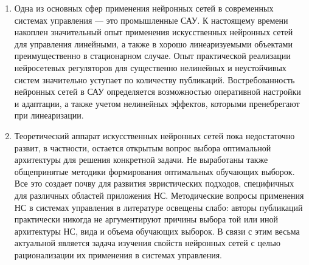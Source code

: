 \begin{enumerate}

\item

Одна из основных сфер применения нейронных сетей в современных
системах управления --- это промышленные САУ.  К настоящему времени
накоплен значительный опыт применения искусственных нейронных сетей
для управления линейными, а также в хорошо линеаризуемыми объектами
преимущественно в стационарном случае.  Опыт практической реализации
нейросетевых регуляторов для существенно нелинейных и неустойчивых
систем значительно уступает по количеству публикаций.
Востребованность нейронных сетей в САУ определяется возможностью
оперативной настройки и адаптации, а также учетом нелинейных эффектов,
которыми пренебрегают при линеаризации.



\item
Теоретический аппарат искусственных нейронных сетей пока недостаточно
развит, в частности, остается открытым вопрос выбора оптимальной
архитектуры для решения конкретной задачи.  Не выработаны также
общепринятые методики формирования оптимальных обучающих выборок.  Все
это создает почву для развития эвристических подходов, специфичных для
различных областей приложения НС.  Методические вопросы применения НС
в системах управления в литературе освещены слабо: авторы публикаций
практически никогда не аргументируют причины выбора той или иной
архитектуры НС, вида и объема обучающих выборок.  В связи с этим
весьма актуальной является задача изучения свойств нейронных сетей с
целью рационализации их применения в системах управления.


\end{enumerate}
